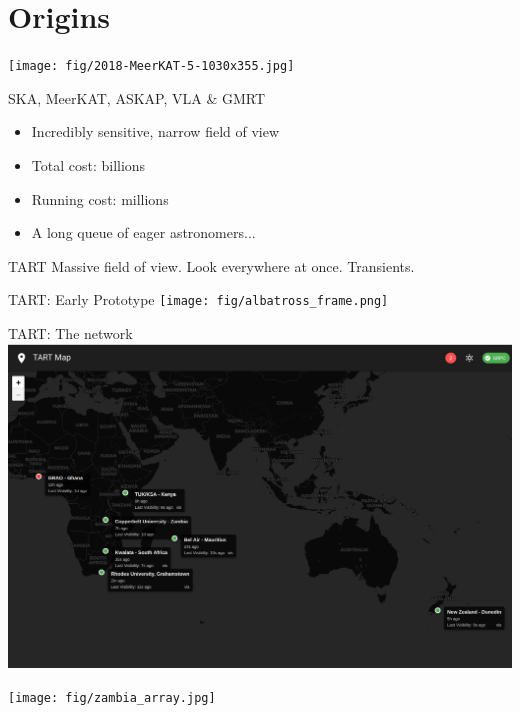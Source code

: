\documentclass[ignorenonframetext]{beamer}
\begin{document}
\section{Origins}

\begin{frame}
\texttt{[image: fig/2018-MeerKAT-5-1030x355.jpg]}
\begin{block}{SKA, MeerKAT, ASKAP, VLA \& GMRT}
\begin{itemize}
\item Incredibly sensitive, narrow field of view
\item Total cost: billions
\item Running cost: millions
\item A long queue of eager astronomers...
\end{itemize}\end{block}
\begin{block}{TART}
 Massive field of view. Look everywhere at once. Transients.
\end{block}
\end{frame}

\begin{frame}{TART: Early Prototype}
   \texttt{[image: fig/albatross\_frame.png]}
\end{frame}
%


\begin{frame}{TART: The network}
   \includegraphics[width=\linewidth]{fig/web_map.png}
\end{frame}

\begin{frame}
   \texttt{[image: fig/zambia\_array.jpg]}
\end{frame}
%
\end{document}
